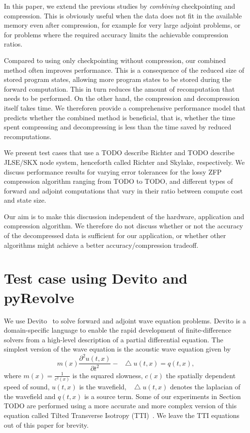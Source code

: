 \documentclass[conference]{IEEEtran}
\newcommand*\Laplace{\mathop{}\!\mathbin\bigtriangleup}
\begin{document}
In this paper, we extend the previous studies by \emph{combining} checkpointing
and compression. This is obviously useful when the data does not fit in the
available memory even after compression, for example for very large adjoint
problems, or for problems where the required accuracy limits the achievable
compression ratios.

Compared to using only checkpointing without compression, our combined method
often improves performance. This is a consequence of the reduced size of stored
program states, allowing more program states to be stored during the forward
computation. This in turn reduces the amount of recomputation that needs to be
performed. On the other hand, the compression and decompression itself takes
time. We thereforen provide a comprehensive performance model that predicts
whether the combined method is beneficial, that is, whether the time spent
compressing and decompressing is less than the time saved by reduced
recomputations.

We present test cases that use a TODO describe Richter
and TODO describe JLSE/SKX node system, henceforth called Richter and Skylake,
respectively. We discuss performance results for varying error tolerances for
the lossy ZFP compression algorithm ranging from TODO to TODO, and different
types of forward and adjoint computations that vary in their ratio between
compute cost and state size. 

Our aim is to make this discussion independent of the hardware, application and
compression algorithm. We therefore do not discuss whether or not the accuracy
of the decompressed data is sufficient for our application, or whether
other algorithms might achieve a better accuracy/compression tradeoff.

\section{Test case using Devito and pyRevolve}
We use Devito~\cite{devito-api,devito-compiler} to solve forward and adjoint
wave equation problems. Devito is a domain-specific language to enable the
rapid development of finite-difference solvers from a high-level description
of a partial differential equation. The simplest version of the wave
equation is the acoustic wave equation given by
\begin{equation}
m(x)\frac{\partial^2 u(t, x)}{\partial t^2} - \Laplace u(t, x) = q(t, x),
\label{eqn:wave}
\end{equation}
where $m(x) = \frac{1}{c^2(x)}$ is the squared slowness, $c(x)$ the spatially
dependent speed of sound, $u(t, x)$ is the wavefield, $\Laplace u(t, x)$
denotes the laplacian of the wavefield and $q(t, x)$ is a source term.
Some of our experiments in Section TODO are performed using a more accurate
and more complex version of this equation called Tilted Transverse Isotropy
(TTI)~\cite{zhang2011stable}. We leave the TTI equations out of this paper
for brevity. 
\end{document}
